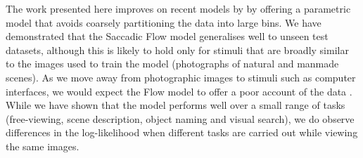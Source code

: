 \documentclass[a4paper, twocolumn, oneside, 11pt]{article}
\begin{document}
The work presented here improves on recent models by \cite{clarke2016,leMeur-coutrot2016} by offering a parametric model that avoids coarsely partitioning the data into large bins. We have demonstrated that the Saccadic Flow model generalises well to unseen test datasets, although this is likely to hold only for stimuli that are broadly similar to the images used to train the model (photographs of natural and manmade scenes). As we move away from photographic images to stimuli such as computer interfaces, we would expect the Flow model to offer a poor account of the data \citep{leMeur-coutrot2016}. While we have shown that the model performs well over a small range of tasks (free-viewing, scene description, object naming and visual search), we do observe differences in the log-likelihood when different tasks are carried out while viewing the same images. 
\end{document}
